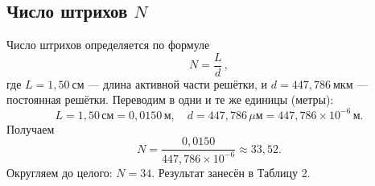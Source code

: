 \subsection*{Число штрихов \(N\)}

Число штрихов определяется по формуле
\[
	N = \frac{L}{d}\,,
\]
где \(L = 1{,}50\ \text{см}\) — длина активной части решётки,
и \(d = 447{,}786\ \text{мкм}\) — постоянная решётки.
Переводим в одни и те же единицы (метры):
\[
	L = 1{,}50\,\text{см} = 0{,}0150\,\text{м},
	\quad
	d = 447{,}786\,\mu\text{м} = 447{,}786 \times 10^{-6}\,\text{м}.
\]
Получаем
\[
	N = \frac{0{,}0150}{447{,}786\times10^{-6}}
	\approx 33{,}52.
\]
Округляем до целого: \(N = 34\).
Результат занесён в Таблицу 2.
